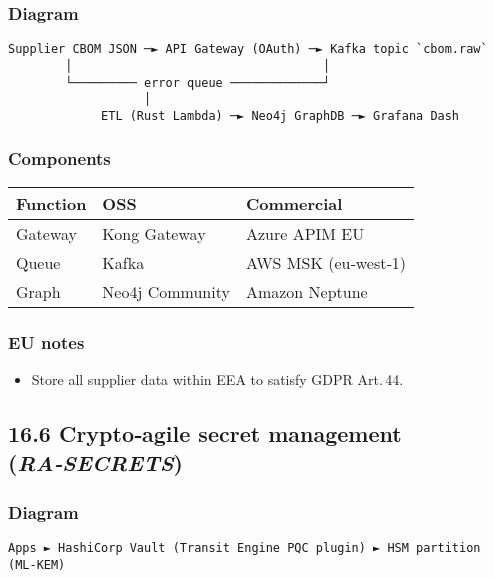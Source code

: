 \documentclass[
  english,
]{article}
\providecommand{\tightlist}{%
  \setlength{\itemsep}{0pt}\setlength{\parskip}{0pt}}
\begin{document}
\subsubsection{Diagram}\label{diagram-3}

\begin{verbatim}
Supplier CBOM JSON ─► API Gateway (OAuth) ─► Kafka topic `cbom.raw`
        │                                   │
        └───────── error queue ─────────────┘
                   │
             ETL (Rust Lambda) ─► Neo4j GraphDB ─► Grafana Dash
\end{verbatim}

\subsubsection{Components}\label{components-3}

\begin{longtable}[]{@{}lll@{}}
\toprule\noalign{}
Function & OSS & Commercial \\
\midrule\noalign{}
\endhead
\bottomrule\noalign{}
\endlastfoot
Gateway & Kong Gateway & Azure APIM EU \\
Queue & Kafka & AWS MSK (eu‑west‑1) \\
Graph & Neo4j Community & Amazon Neptune \\
\end{longtable}

\subsubsection{EU notes}\label{eu-notes-1}

\begin{itemize}
\tightlist
\item
  Store all supplier data within EEA to satisfy GDPR Art.\,44.
\end{itemize}

\subsection{\texorpdfstring{16.6 Crypto‑agile secret management
(\emph{RA‑SECRETS})}{16.6 Crypto‑agile secret management (RA‑SECRETS)}}\label{cryptoagile-secret-management-rasecrets}

\subsubsection{Diagram}\label{diagram-4}

\begin{verbatim}
Apps ► HashiCorp Vault (Transit Engine PQC plugin) ► HSM partition (ML‑KEM)
\end{verbatim}
\end{document}
